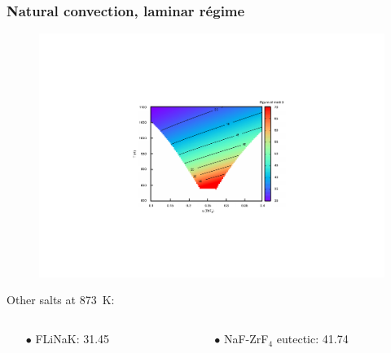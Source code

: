 \documentclass{beamer}
\begin{document}
\begin{frame}
   \frametitle{Natural convection, laminar r\'egime}
   \begin{figure}
   \includegraphics[width=.6\textwidth]{merit3}
   \end{figure}

  Other salts at 873~K:
    \begin{columns}
      \begin{column}{6cm}
        \begin{itemize}
           \item[$\bullet$] FLiNaK: 31.45
        \end{itemize}
      \end{column}
      \begin{column}{6cm}
        \begin{itemize}
           \item[$\bullet$] NaF-ZrF$_4$ eutectic: 41.74
        \end{itemize}
      \end{column}
   \end{columns}
   
\end{frame}
\end{document}
